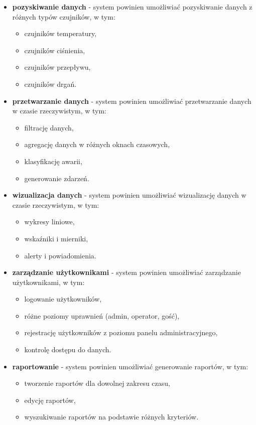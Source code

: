\begin{itemize}
    \item \textbf{pozyskiwanie danych} - system powinien umożliwiać pozyskiwanie danych z różnych typów czujników, w tym:
   \begin{itemize}
       \item czujników temperatury,
       \item czujników ciśnienia,
       \item czujników przepływu,
       \item czujników drgań.
   \end{itemize}
    
    \item \textbf{przetwarzanie danych} - system powinien umożliwiać przetwarzanie danych w czasie rzeczywistym, w tym:
    \begin{itemize}
        \item filtrację danych,
        \item agregację danych w różnych oknach czasowych,
        \item klasyfikację awarii,
        \item generowanie zdarzeń.
    \end{itemize}
    
    \item \textbf{wizualizacja danych} - system powinien umożliwiać wizualizację danych w czasie rzeczywistym, w tym:
    \begin{itemize}
        \item wykresy liniowe,
        \item wskaźniki i mierniki,
        \item alerty i powiadomienia.
    \end{itemize}
    
   \item \textbf{zarządzanie użytkownikami} - system powinien umożliwiać zarządzanie użytkownikami, w tym:
   \begin{itemize}
       \item logowanie użytkowników,
       \item różne poziomy uprawnień (admin, operator, gość),
       \item rejestrację użytkowników z poziomu panelu administracyjnego,
       \item kontrolę dostępu do danych.
   \end{itemize}
    
    \item \textbf{raportowanie} - system powinien umożliwiać generowanie raportów, w tym:
   \begin{itemize}
       \item tworzenie raportów dla dowolnej zakresu czasu,
       \item edycję raportów,
       \item wyszukiwanie raportów na podstawie różnych kryteriów.
   \end{itemize}
\end{itemize}

